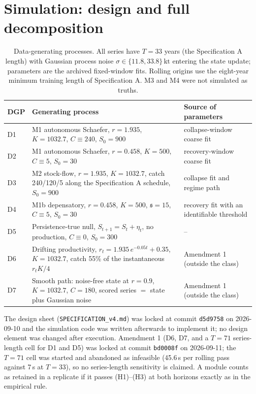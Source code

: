 \documentclass[preprint,11pt,authoryear]{elsarticle}
\theoremstyle{remark}
\newcommand{\kt}{\,\mathrm{kt}}
\newcommand{\sA}{\mathfrak{s}}
\begin{document}
\FloatBarrier
\section{Simulation: design and full decomposition}\label{si:sim}

\begin{table}[!htb]
\centering\small
\caption{Data-generating processes. All series have $T=33$ years (the Specification A length) with Gaussian process noise $\sigma\in\{11.8, 33.8\}\kt$ entering the state update; parameters are the archived fixed-window fits. Rolling origins use the eight-year minimum training length of Specification A. M3 and M4 were not simulated as truths.}
\label{tab:si_dgp}
\begin{tabularx}{\textwidth}{@{}lLL@{}}
\toprule
DGP & Generating process & Source of parameters \\
\midrule
D1 & M1 autonomous Schaefer, $r=1.935$, $K=1032.7$, $C\equiv 240$, $S_0 = 900$ & collapse-window coarse fit \\
D2 & M1 autonomous Schaefer, $r=0.458$, $K=500$, $C\equiv 5$, $S_0 = 30$ & recovery-window coarse fit \\
D3 & M2 stock-flow, $r=1.935$, $K=1032.7$, catch 240/120/5 along the Specification A schedule, $S_0=900$ & collapse fit and regime path \\
D4 & M1b depensatory, $r=0.458$, $K=500$, $\sA=15$, $C\equiv 5$, $S_0=30$ & recovery fit with an identifiable threshold \\
D5 & Persistence-true null, $S_{t+1} = S_t + \eta_t$, no production, $C\equiv 0$, $S_0=300$ & -- \\
D6 & Drifting productivity, $r_t = 1.935\,e^{-0.05t} + 0.35$, $K=1032.7$, catch 55\% of the instantaneous $r_tK/4$ & Amendment 1 (outside the class) \\
D7 & Smooth path: noise-free state at $r=0.9$, $K=1032.7$, $C=180$, scored series $=$ state plus Gaussian noise & Amendment 1 (outside the class) \\
\bottomrule
\end{tabularx}
\end{table}

The design sheet (\texttt{SPECIFICATION\_v4.md}) was locked at commit \texttt{d5d9758} on 2026-09-10 and the simulation code was written afterwards to implement it; no design element was changed after execution. Amendment 1 (D6, D7, and a $T=71$ series-length cell for D1 and D5) was locked at commit \texttt{bd0008f} on 2026-09-11; the $T=71$ cell was started and abandoned as infeasible (45.6\,s per rolling pass against 7\,s at $T=33$), so no series-length sensitivity is claimed. A module counts as retained in a replicate if it passes (H1)--(H3) at both horizons exactly as in the empirical rule.
\end{document}
